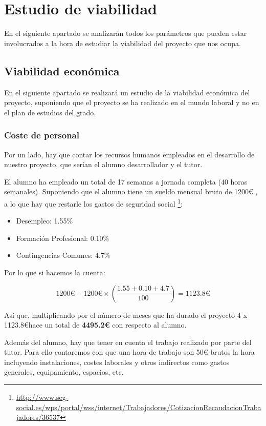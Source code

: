 \section{Estudio de viabilidad}

En el siguiente apartado se analizarán todos los parámetros que pueden estar involucrados a la hora de estudiar la viabilidad del proyecto que nos ocupa.

\subsection{Viabilidad económica}

En el siguiente apartado se realizará un estudio de la viabilidad económica del proyecto, suponiendo que el proyecto se ha realizado en el mundo laboral y no en el plan de estudios del grado.

\subsubsection{Coste de personal}
Por un lado, hay que contar los recursos humanos empleados en el desarrollo de nuestro proyecto, que serían el alumno desarrollador y el tutor.

El alumno ha empleado un total de 17 semanas a jornada completa (40 horas semanales). Suponiendo que el alumno tiene un sueldo mensual bruto de 1200€ , a lo que hay que restarle los gastos de seguridad social \footnote{\url{http://www.seg-social.es/wps/portal/wss/internet/Trabajadores/CotizacionRecaudacionTrabajadores/36537}}:

\begin{itemize}
	\item Desempleo: 1.55\%
	\item Formación Profesional: 0.10\%
	\item Contingencias Comunes: 4.7\%
\end{itemize}

Por lo que si hacemos la cuenta:

\[1200\euro - 1200\euro \times \left (\frac{1.55 + 0.10 + 4.7}{100}\right ) = 1123.8\euro \]

Así que, multiplicando por el número de meses que ha durado el proyecto 4 x 1123.8\euro hace un total de \textbf{4495.2€} con respecto al alumno.

Además del alumno, hay que tener en cuenta el trabajo realizado por parte del tutor. Para ello contaremos con que una hora de trabajo son 50€ brutos la hora incluyendo instalaciones, costes laborales y otros indirectos como gastos generales, equipamiento, espacios, etc.

